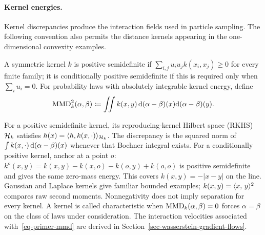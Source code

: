 \paragraph{Kernel energies.}\label{sec-rkhs-mmd}
Kernel discrepancies produce the interaction fields used in particle sampling. The following convention also permits the distance kernels appearing in the one-dimensional convexity examples.
\begin{defn}\label{def-kernel-mmd-norm}\label{def-positive-kernels}
A symmetric kernel $k$ is positive semidefinite if $\sum_{i,j}u_i u_jk(x_i,x_j)\geq0$ for every finite family; it is conditionally positive semidefinite if this is required only when $\sum_i u_i=0$. For probability laws with absolutely integrable kernel energy, define
\begin{equation}\label{eq-primer-mmd}
  \operatorname{MMD}_k^2(\alpha,\beta)\coloneqq
  \iint k(x,y)\,\mathrm{d}(\alpha-\beta)(x)\mathrm{d}(\alpha-\beta)(y).
\end{equation}
\end{defn}
For a positive semidefinite kernel, its reproducing-kernel Hilbert space (RKHS) $\mathcal{H}_k$ satisfies $h(x)=\langle h,k(x,\cdot)\rangle_{\mathcal{H}_k}$. The discrepancy is the squared norm of $\int k(x,\cdot)\,\mathrm{d}(\alpha-\beta)(x)$ whenever that Bochner integral exists. For a conditionally positive kernel, anchor at a point $o$: $k^o(x,y)=k(x,y)-k(x,o)-k(o,y)+k(o,o)$ is positive semidefinite and gives the same zero-mass energy. This covers $k(x,y)=-|x-y|$ on the line. Gaussian and Laplace kernels give familiar bounded examples; $k(x,y)=\langle x,\,y\rangle^2$ compares raw second moments. Nonnegativity does not imply separation for every kernel. A kernel is called characteristic when $\operatorname{MMD}_k(\alpha,\beta)=0$ forces $\alpha=\beta$ on the class of laws under consideration. The interaction velocities associated with~\eqref{eq-primer-mmd} are derived in Section~\ref{sec-wasserstein-gradient-flows}.


\FloatBarrier
